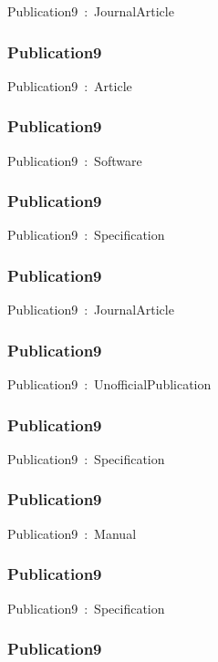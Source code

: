 \documentclass{article}
\begin{document}
Publication9~:~JournalArticle

\subsubsection*{Publication9}

Publication9~:~Article

\subsubsection*{Publication9}

Publication9~:~Software

\subsubsection*{Publication9}

Publication9~:~Specification

\subsubsection*{Publication9}

Publication9~:~JournalArticle

\subsubsection*{Publication9}

Publication9~:~UnofficialPublication

\subsubsection*{Publication9}

Publication9~:~Specification

\subsubsection*{Publication9}

Publication9~:~Manual

\subsubsection*{Publication9}

Publication9~:~Specification

\subsubsection*{Publication9}
\end{document}
